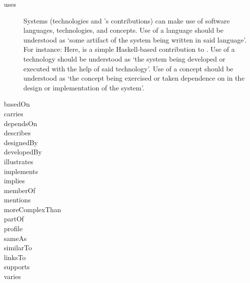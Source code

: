 \noindent
\begin{description}

\item[uses] Systems (technologies and \ooo{}'s contributions) can make
  use of software languages, technologies, and concepts. Use of a
  language should be understood as `some artifact of the system being
  written in said language'. For instance:
  \noindent
  Here,  is a simple Haskell-based
  contribution to \ooo{}. Use of a technology should be understood as
  `the system being developed or executed with the help of said
  technology'. Use of a concept should be understood as `the concept
  being exercised or taken dependence on in the design or
  implementation of the system'.

\medskip

\item[basedOn]
%
\item[carries]
%
\item[dependsOn]
%
\item[describes]
%
\item[designedBy]
%
\item[developedBy]
%
\item[illustrates]
%
\item[implements]
%
\item[implies]
%
\item[memberOf]
%
\item[mentions]
%
\item[moreComplexThan]
%
\item[partOf]
%
\item[profile]
%
\item[sameAs]
%
\item[similarTo]
%
\item[linksTo]
%
\item[supports]
%
\item[varies]
%
\end{description}

